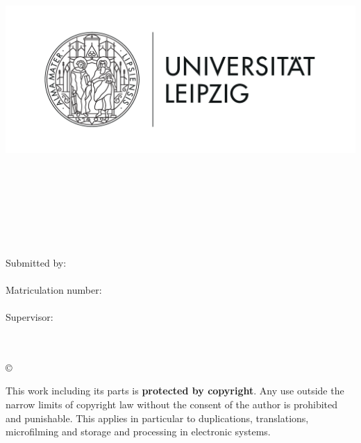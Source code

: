 \thispagestyle{plain}
\begin{titlepage}

  \begin{center}
    \includegraphics[height=7cm]{Images/Uni-L.png}\\[2.5ex]

    \hochschule\\
    \institut\\
    \fakultaet\\
    \fachgebiet\\[6ex]

    \textbf{\large\titel}\\[1.5ex]
    \art\\[6ex]

    \normalsize
    Submitted by:\\
    \autor\\[1.5ex]
    Matriculation number:\\
    \matrikelnr\\[1.5ex]
    Supervisor:\\
    \erstbetreuer\\
    \zweitbetreuer\\[1.0ex]
  \end{center}


  \begin{center}
    \copyright\ \jahr\\[1.0ex]
  \end{center}

  \singlespacing
  \small
  \noindent This work including its parts is \textbf{protected by copyright}. Any use outside the narrow limits of copyright law without the consent of the author is prohibited and punishable. This applies in particular to duplications, translations, microfilming and storage and processing in electronic systems.

\end{titlepage}
